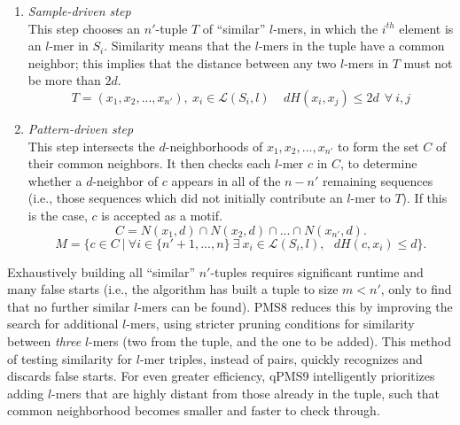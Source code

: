 \documentclass[oneside,12pt]{DISCSthesis}
\begin{document}
		\begin{enumerate}
			\item {\em Sample-driven step}\\
				This step chooses an $n'$-tuple $T$ of ``similar'' $l$-mers, in which the $i^{th}$ element is an $l$-mer in $S_i$.
				Similarity means that the $l$-mers in the tuple have a common neighbor; this implies that the distance between any two $l$-mers in $T$ must not be more than $2d$.
				\begin{equation}
					T = (x_{1}, x_{2}, ..., x_{n'}),\ x_i \in \mathcal{L}(S_i, l) \ \ \ \ \ 
					dH(x_{i}, x_{j}) \leq 2d\ \ \forall\ i,j
					\end{equation}\vspace{-5mm}
			\item {\em Pattern-driven step}\\
				This step intersects the $d$-neighborhoods of $x_{1}, x_{2}, ..., x_{n'}$ to form the set $C$ of their common neighbors. It then checks each $l$-mer $c$ in $C$, to determine whether a $d$-neighbor of $c$ appears in all of the $n-n'$ remaining sequences (i.e., those sequences which did not initially contribute an $l$-mer to $T$). If this is the case, $c$ is accepted as a motif.
				\begin{equation}
					C = N(x_{1}, d) \cap N(x_{2}, d) \cap...\cap N(x_{n'}, d).
					\end{equation} %
				\begin{equation}
					M =\{ c \in C\ |\ \forall i \in \{n'+1,...,n\}\ \exists\ x_i \in \mathcal{L}(S_i, l),\ \ \ 
					dH(c, x_i) \leq d \}.
					\end{equation}
		\end{enumerate}
		\noindent Exhaustively building all ``similar'' $n'$-tuples requires significant runtime and many false starts (i.e., the algorithm has built a tuple to size $m < n'$, only to find that no further similar $l$-mers can be found). PMS8 reduces this by improving the search for additional $l$-mers, using stricter pruning conditions for similarity between {\em three} $l$-mers (two from the tuple, and the one to be added). This method of testing similarity for $l$-mer triples, instead of pairs, quickly recognizes and discards false starts. For even greater efficiency, qPMS9 intelligently prioritizes adding $l$-mers that are highly distant from those already in the tuple, such that common neighborhood becomes smaller and faster to check through.
\end{document}
